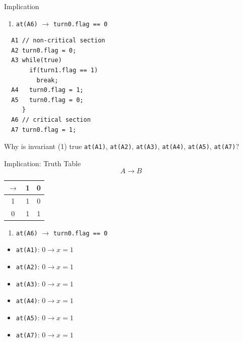\begin{frame}[fragile]{Implication}
  \begin{enumerate}
  \item \lstinline!at(A6)! $\rightarrow$ \lstinline!turn0.flag == 0!
  \end{enumerate}


\begin{lstlisting}
  A1 // non-critical section
  A2 turn0.flag = 0;
  A3 while(true)
       if(turn1.flag == 1) 
         break;
  A4   turn0.flag = 1;
  A5   turn0.flag = 0;
     }
  A6 // critical section
  A7 turn0.flag = 1;
\end{lstlisting}


  Why is invariant (1) true \lstinline!at(A1)!, \lstinline!at(A2)!,
  \lstinline!at(A3)!, \lstinline!at(A4)!, \lstinline!at(A5)!,
  \lstinline!at(A7)!?
\end{frame}

\begin{frame}{Implication: Truth Table}
  $$A \rightarrow B$$


  \begin{center}
    \begin{tabular}{|c|c c|}
      \hline
      $\rightarrow$ & 1 & 0 \\\hline
      1 & 1 & 0 \\
      0 & 1 & 1 \\\hline
    \end{tabular}
  \end{center}


  \begin{enumerate}
  \item \lstinline!at(A6)! $\rightarrow$ \lstinline!turn0.flag == 0!
  \end{enumerate}


  \begin{itemize}
  \item \lstinline!at(A1)!: $0 \rightarrow x = 1$
  \item \lstinline!at(A2)!: $0 \rightarrow x = 1$
  \item \lstinline!at(A3)!: $0 \rightarrow x = 1$
  \item \lstinline!at(A4)!: $0 \rightarrow x = 1$
  \item \lstinline!at(A5)!: $0 \rightarrow x = 1$
  \item \lstinline!at(A7)!: $0 \rightarrow x = 1$
  \end{itemize}
\end{frame}


